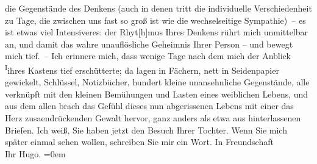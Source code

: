 \begin{ledgroupsized}[t]{13cm}
                    die Gegenstände des Denkens (auch in denen tritt die individuelle
                    Verschiedenheit zu Tage, die zwischen uns fast so groß ist wie die
                    wechselseitige Sympathie) – {\pb}es ist etwas viel Intensiveres: der Rhyt{[}h{]}mus Ihres
                    Denkens rührt mich unmittelbar an, und damit das wahre unauflösliche Geheimnis
                    Ihrer Person – und bewegt mich tief. – Ich erinnere mich, dass wenige Tage nach
                    dem \label{K_L02496_1v}\label{K_L02496_1h} mich der Anblick \substVorne{}\textsuperscript{I}\substDazwischen{}i\substHinten{}hres Kastens tief erschütterte; da lagen in Fächern, nett in
                    Seidenpapier gewickelt, Schlüssel, Notizbücher, hundert kleine unansehnliche
                    Gegenstände, alle verknüpft mit den kleinen Bemühungen und Lasten eines
                    weiblichen Lebens, und aus dem allen brach das Gefühl dieses nun abgerissenen
                    Lebens mit einer das Herz zusa{\geminationm}endrückenden Gewalt
                    hervor, ganz anders als etwa aus hinterlassenen Briefen.\pend
           \pstart
           Ich weiß, Sie haben jetzt den Besuch Ihrer Tochter. Wenn Sie mich später einmal sehen wollen,
                    schreiben Sie mir ein Wort.\pend
           \pstart
           In Freundschaft{\\[\baselineskip]}Ihr \spacefill\mbox{Hugo.}\pend
           \leftskip=0em{}          \endnumbering{}\end{ledgroupsized}  \newcommand{\dateiname}{L02496}\newcommand{\titel}{Hugo Hofmannsthal an Arthur Schnitzler, 29. 12. 1927}\newcommand{\editorInnen}{Martin Anton Müller und Gerd-Hermann Susen}
            \footnotesize
\begin{ledgroupsized}[t]{11.5cm}
\end{ledgroupsized}
         
      